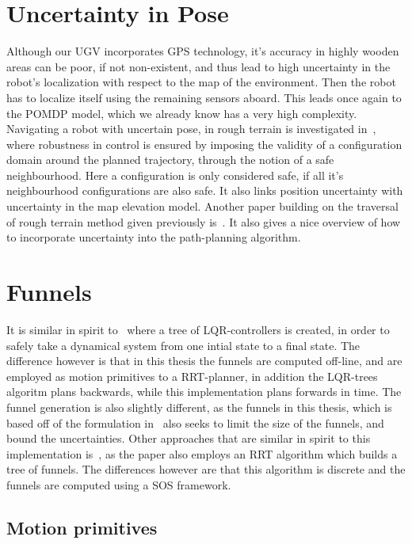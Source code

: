 \section{Uncertainty in Pose}
Although our UGV incorporates GPS technology, it's accuracy in highly wooden
areas can be poor, if not non-existent, and thus lead to high uncertainty in the
robot's localization with respect to the map of the environment. Then the robot
has to localize itself using the remaining sensors aboard. This leads once again
to the POMDP model, which we already know has a very high complexity. Navigating
a robot with uncertain pose, in rough terrain is investigated
in~\cite{haitMotionPlanningRough1996}, where robustness in control is ensured by
imposing the validity of a configuration domain around the planned trajectory,
through the notion of a safe neighbourhood. Here a configuration is only
considered safe, if all it's neighbourhood configurations are also safe. It also
links position uncertainty with uncertainty in the map elevation model. Another
paper building on the traversal of rough terrain method given previously
is~\cite{iagnemmaRapidPhysicsbasedRoughterrain1999}. It also gives a nice
overview of how to incorporate uncertainty into the path-planning algorithm.

\section{Funnels}

It is similar in spirit to~\cite{tedrakeLQRtreesFeedbackMotion2009} where a tree
of \ac{LQR}-controllers is created, in order to safely take a dynamical system
from one intial state to a final state. The difference however is that in this
thesis the funnels are computed off-line, and are employed as motion primitives
to a \ac{RRT}-planner, in addition the \ac{LQR}-trees algoritm plans backwards,
while this implementation plans forwards in time. The funnel generation is also
slightly different, as the funnels in this thesis, which is based off of the
formulation in~\cite{majumdarFunnelLibrariesRealtime2017} also seeks to limit
the size of the funnels, and bound the uncertainties. Other approaches that are
similar in spirit to this implementation
is~\cite{lenySequentialCompositionRobust2012}, as the paper also employs an
\ac{RRT} algorithm which builds a tree of funnels. The differences however are
that this algorithm is discrete and the funnels are computed using a \ac{SOS}
framework.

\subsection{Motion primitives}

